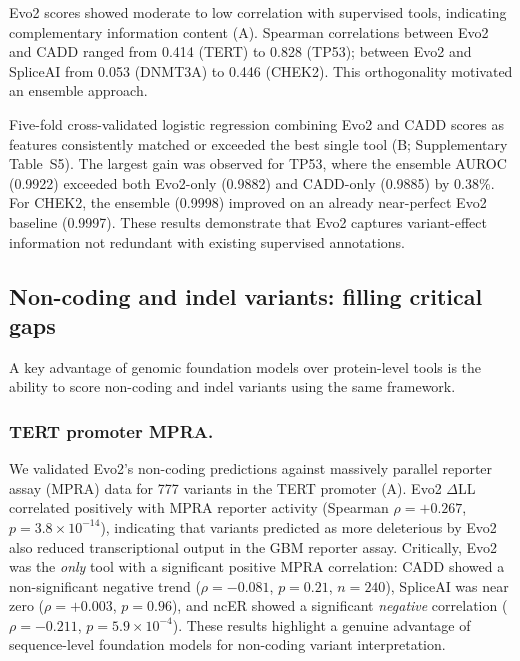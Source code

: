 Evo2 scores showed moderate to low correlation with supervised tools, indicating
complementary information content (A). Spearman
correlations between Evo2 and CADD ranged from 0.414 (TERT) to 0.828 (TP53);
between Evo2 and SpliceAI from 0.053 (DNMT3A) to 0.446 (CHEK2). This
orthogonality motivated an ensemble approach.

Five-fold cross-validated logistic regression combining Evo2 and CADD scores
as features consistently matched or exceeded the best single tool
(B; Supplementary Table~S5). The largest gain
was observed for TP53, where the ensemble AUROC (0.9922) exceeded both Evo2-only
(0.9882) and CADD-only (0.9885) by 0.38\%. For CHEK2, the ensemble (0.9998)
improved on an already near-perfect Evo2 baseline (0.9997). These results
demonstrate that Evo2 captures variant-effect information not redundant with
existing supervised annotations.

\subsection{Non-coding and indel variants: filling critical gaps}
\label{sec:results_noncoding}

A key advantage of genomic foundation models over protein-level tools is the
ability to score non-coding and indel variants using the same framework.

\subsubsection*{TERT promoter MPRA.}

We validated Evo2's non-coding predictions against massively parallel reporter
assay (MPRA) data for 777 variants in the TERT promoter
(A). Evo2 $\Delta$LL correlated positively with MPRA
reporter activity (Spearman $\rho = +0.267$, $p = 3.8 \times 10^{-14}$),
indicating that variants predicted as more deleterious by Evo2 also reduced
transcriptional output in the GBM reporter assay. Critically, Evo2 was the
\textit{only} tool with a significant positive MPRA correlation: CADD showed
a non-significant negative trend ($\rho = -0.081$, $p = 0.21$, $n = 240$),
SpliceAI was near zero ($\rho = +0.003$, $p = 0.96$), and ncER showed a
significant \textit{negative} correlation ($\rho = -0.211$, $p = 5.9 \times 10^{-4}$).
These results highlight a genuine advantage of sequence-level foundation models
for non-coding variant interpretation.

